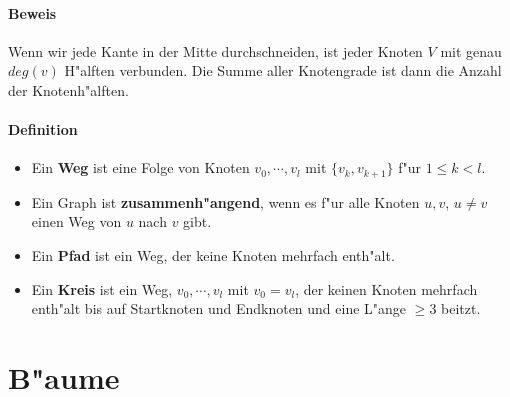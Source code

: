\paragraph{Beweis} \parskp
Wenn wir jede Kante in der Mitte durchschneiden, ist jeder Knoten $V$ mit genau $deg(v)$ H"alften verbunden.
Die Summe aller Knotengrade ist dann die Anzahl der Knotenh"alften.

\paragraph{Definition}
\begin{itemize}
    \item Ein \textbf{Weg} ist eine Folge von Knoten $v_0,\cdots,v_l$ mit $\{v_k,v_{k+1}\}$ f"ur $1\le k<l$.\\
    \item Ein Graph ist \textbf{zusammenh"angend}, wenn es f"ur alle Knoten $u,v$, $u\ne v$ einen Weg von $u$
          nach $v$ gibt.
    \item Ein \textbf{Pfad} ist ein Weg, der keine Knoten mehrfach enth"alt.
    \item Ein \textbf{Kreis} ist ein Weg, $v_0,\cdots,v_l$ mit $v_0=v_l$, der keinen Knoten mehrfach enth"alt
          bis auf Startknoten und Endknoten und eine L"ange $\ge3$ beitzt.
\end{itemize}

\section{B"aume}

